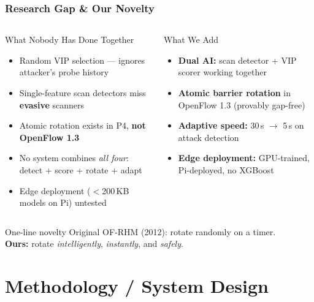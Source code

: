 \documentclass{beamer}
\begin{document}
\begin{frame}
\frametitle{Research Gap \& Our Novelty}

\begin{columns}

\begin{alertblock}{What Nobody Has Done Together}
\begin{itemize}
  \item Random VIP selection --- ignores attacker's probe history
  \item Single-feature scan detectors miss \textbf{evasive} scanners
  \item Atomic rotation exists in P4, \textbf{not OpenFlow 1.3}
  \item No system combines \textit{all four}: detect + score + rotate + adapt
  \item Edge deployment ($<$200\,KB models on Pi) untested
\end{itemize}
\end{alertblock}

\begin{exampleblock}{What We Add}
\begin{itemize}
  \item \textbf{Dual AI:} scan detector + VIP scorer working together
  \item \textbf{Atomic barrier rotation} in OpenFlow 1.3 (provably gap-free)
  \item \textbf{Adaptive speed:} 30\,s $\to$ 5\,s on attack detection
  \item \textbf{Edge deployment:} GPU-trained, Pi-deployed, no XGBoost
\end{itemize}
\end{exampleblock}

\end{columns}

\vspace{6pt}
\begin{block}{One-line novelty}
Original OF-RHM (2012): rotate randomly on a timer.\\
\textbf{Ours:} rotate \textit{intelligently}, \textit{instantly}, and \textit{safely}.
\end{block}

\end{frame}

\section{Methodology / System Design}
\end{document}
